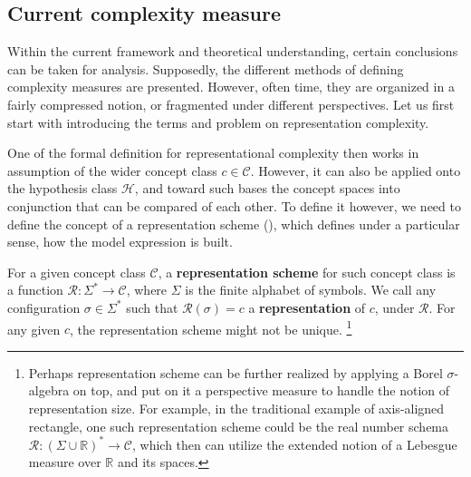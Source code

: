 \subsection{Current complexity measure}

Within the current framework and theoretical understanding, certain conclusions can be taken for analysis. Supposedly, the different methods of defining complexity measures are presented. However, often time, they are organized in a fairly compressed notion, or fragmented under different perspectives. Let us first start with introducing the terms and problem on representation complexity. 

One of the formal definition for representational complexity then works in assumption of the wider concept class $c\in \mathcal{C}$. However, it can also be applied onto the hypothesis class $\mathcal{H}$, and toward such bases the concept spaces into conjunction that can be compared of each other. To define it however, we need to define the concept of a representation scheme (\cite{10.5555/200548}), which defines under a particular sense, how the model expression is built. 

\begin{definition}
    For a given concept class $\mathcal{C}$, a \textbf{representation scheme} for such concept class is a function $\mathcal{R}: \Sigma^{*}\to \mathcal{C}$, where $\Sigma$ is the finite alphabet of symbols. We call any configuration $\sigma \in \Sigma^{*}$ such that $\mathcal{R}(\sigma)=c$ a \textbf{representation} of $c$, under $\mathcal{R}$. For any given $c$, the representation scheme might not be unique. \footnote{Perhaps representation scheme can be further realized by applying a Borel $\sigma$-algebra on top, and put on it a perspective measure to handle the notion of representation size. For example, in the traditional example of axis-aligned rectangle, one such representation scheme could be the real number schema $\mathcal{R}:(\Sigma \cup \mathbb{R})^{*}\to \mathcal{C}$, which then can utilize the extended notion of a Lebesgue measure over $\mathbb{R}$ and its spaces.}
\end{definition} 

